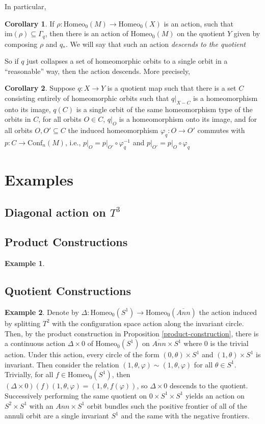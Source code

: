 \documentclass[10pt, oneside]{article}
\newcommand{\homeo}[1][S^1]{\text{Homeo}_0(#1)}
\newcommand{\conf}[2][S^1]{\text{Conf}_{#2}(#1)}
\theoremstyle{definition}
\newtheorem{ex}{Example}[section]
\newtheorem{cor}{Corollary}[section]
\theoremstyle{definition}
\begin{document}
In particular,
\begin{cor}
    If $\rho:\homeo[M]\to\homeo[X]$ is an action,
    such that $\text{im}(\rho)\subseteq \Gamma_q$,
    then there is an action
    of $\homeo[M]$
    on the quotient $Y$
    given by composing $\rho$ and $q_*$.
    We will say
    that such an action
    \textit{descends to the quotient}
\end{cor}
So if $q$ just collapses a set 
of homeomorphic orbits 
to a single orbit
in a ``reasonable'' way,
then the action descends. More precisely,

\begin{cor}
    Suppose $q: X\to Y$ is a quotient map
    such that there is a set $C$
    consisting entirely 
    of homeomorphic orbits 
    such that $q|_{X - C}$ is a homeomorphism onto its image,
    $q(C)$ is a single orbit 
    of the same homeomorphism type
    of the orbits
    in $C$,
    for all orbits $O\in C$, 
    $q|_O$ is a homeomorphism 
    onto its image,
    and for all orbits $O, O'\subseteq C$
    the induced homeomorphism $\varphi_q: O\to O'$ commutes with $p: C \to \conf[M]{n}$, i.e., $p\vert_O = p\vert_{O'}\circ\varphi_q^{-1}$ and  $p\vert_{O'} = p\vert_O\circ\varphi_q$
\end{cor}

\section{Examples}
\subsection{Diagonal action on \texorpdfstring{$T^3$}{T3}}
\subsection{Product Constructions}
\begin{ex}

\end{ex}
\subsection{Quotient Constructions}
\begin{ex}
    Denote by $\Delta:\homeo\to\homeo[\overline{Ann}]$ the action induced by splitting $T^2$ with the configuration space action along the invariant circle. Then, by the product construction in Proposition \ref{product-construction}, there is a continuous action $\Delta \times 0$ of $\homeo$ on $\overline{Ann}\times S^1$ where 0 is the trivial action. Under this action, every circle of the form $(0,\theta) \times S^1$ and $(1, \theta) \times S^1$ is invariant. Then consider the relation $(1, \theta, \varphi) \sim (1, \theta, \varphi)$ for all $\theta\in S^1$. Trivially, for all $f\in\homeo$, then $(\Delta\times 0)(f)(1,\theta, \varphi) = (1, \theta, f(\varphi))$, so $\Delta\times 0$ descends to the quotient. Successively performing the same quotient on $0\times S^1\times S^1$ yields an action on $S^2\times S^1$ with an $Ann\times S^1$ orbit bundles such the positive frontier of all of the annuli orbit are a single invariant $S^1$ and the same with the negative frontiers.
\end{ex}
\end{document}
